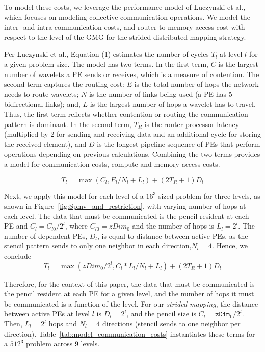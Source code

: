 \documentclass[sigconf]{acmart}
\begin{document}
    To model these costs, we leverage the performance model of Luczynski et al.\cite{luczynski_reduce}, which focuses on modeling collective communication operations. We model the inter- and intra-communication costs, and router to memory access cost with respect to the level of the GMG for the strided distributed mapping strategy.

    Per Luczynski et al., Equation (1) %
    estimates the number of cycles $T_l$ at level $l$ for a given problem size. The model has two terms. In the first term, $C$ is the largest number of wavelets a PE sends or receives, which is a measure of contention. The second term captures the routing cost: $E$ is the total number of hops the network needs to route wavelets; $N$ is the number of links being used (a PE has 5 bidirectional links); and, $L$ is the largest number of hops a wavelet has to travel.  Thus, the first term reflects whether contention or routing the communication pattern is dominant. In the second term, $T_R$ is the router-processor latency (multiplied by 2 for sending and receiving data and an additional cycle for storing the received element), and $D$ is the longest pipeline sequence of PEs that perform operations depending on previous calculations.  Combining the two terms provides a model for communication costs, compute and memory access costs.
    
    \begin{equation}\label{eq:comm_model}
        T_l = \max \left( C_l, E_l / N_l + L_l \right) + (2 T_R + 1) D_l
    \end{equation}

    Next, we apply this model for each level of a $16^3$ sized problem for three levels, as shown in Figure~\ref{fig:Spmv_and_restriction}, with varying number of hops at each level. The data that must be communicated is the pencil resident at each PE and $C_l = C_{l0}/2^l$, where $C_{l0}=zDim_0$ and the number of hops %
    is $L_l = 2^l$. The number of dependent PEs, $D_l$, is equal to distance between active PEs, as the stencil pattern sends to only one neighbor in each direction,$N_l = 4$. Hence, we conclude 
    \begin{equation}
        T_l = \max \left( zDim_0/2^l, C_l*L_l / N_l + L_l \right) + (2 T_R + 1) D_l
        \label{eq:comm_model}
    \end{equation}

    Therefore, for the context of this paper, the data that must be communicated is the pencil resident at each PE for a given level, and the number of hops it must be communicated is a function of the level.  For our \textit{strided mapping}, the distance between active PEs at level $l$ is $D_l = 2^l$, and the pencil size is $C_l = \texttt{zDim}_0/2^l$.  Then, $L_l = 2^l$ hops and $N_l = 4$ directions (stencil sends to one neighbor per direction). Table~\ref{tab:model_communication_costs} instantiates these terms for a $512^3$ problem across 9 levels.
\end{document}
